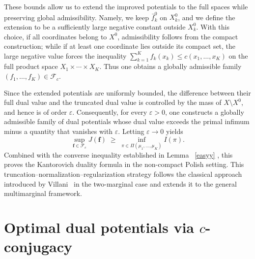 \documentclass[twoside,11pt,a4paper]{article}
\newcommand*{\SavedRef}{}
\let\SavedRef\ref
\renewcommand*{\ref}[1]{  \begingroup
    \hypersetup{
      linkcolor=linkequation,
      linkbordercolor=linkequation,
    }    \SavedRef{#1}  \endgroup
}
\begin{document}
These bounds allow us to extend the improved potentials to the full spaces
while preserving global admissibility. Namely, we keep
\(\bar f_k^0\) on \(X_k^0\), and we define the extension to be a sufficiently
large negative constant outside \(X_k^0\). With this choice, if all coordinates
belong to \(X^0\), admissibility follows from the compact construction; while if
at least one coordinate lies outside its compact set, the large negative value
forces the inequality $
\sum_{k=1}^K f_k(x_k)\le c(x_1,\ldots,x_K)$
on the full product space \(X_1\times\cdots\times X_K\). Thus one obtains a
globally admissible family \((f_1,\dots,f_K)\in\mathcal F_c\).

Since the extended potentials are uniformly bounded, the difference between
their full dual value and the truncated dual value is controlled by the mass of
\(X\setminus X^0\), and hence is of order \(\varepsilon\). Consequently, for
every \(\varepsilon>0\), one constructs a globally admissible family of dual
potentials whose dual value exceeds the primal infimum minus a quantity that
vanishes with \(\varepsilon\). Letting \(\varepsilon\to0\) yields
\[
\sup_{\boldsymbol f\in\mathcal F_c} J(\boldsymbol f)
\;\ge\;
\inf_{\pi\in\Pi(\mu_1,\dots,\mu_K)} I(\pi).
\]
Combined with the converse inequality established in Lemma~\ref{easyy}, this
proves the Kantorovich duality formula in the non-compact Polish setting. This
truncation--normalization--regularization strategy follows the classical
approach introduced by Villani~\cite{villani2003} in the two-marginal case and
extends it to the general multimarginal framework.
















\section{Optimal dual potentials via \texorpdfstring{$c$}{}-conjugacy}\label{secex}
\end{document}
